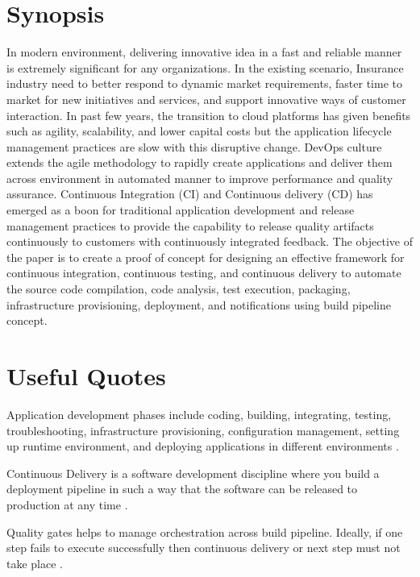 \section{Synopsis}
\label{s:Synopsis-5}
In modern environment, delivering innovative idea in a fast and reliable manner
is extremely significant for any organizations. In the existing scenario,
Insurance industry need to better respond to dynamic market requirements, faster
time to market for new initiatives and services, and support innovative ways of
customer interaction. In past few years, the transition to cloud platforms has
given benefits such as agility, scalability, and lower capital costs but the
application lifecycle management practices are slow with this disruptive change.
DevOps culture extends the agile methodology to rapidly create applications and
deliver them across environment in automated manner to improve performance and
quality assurance. Continuous Integration (CI) and Continuous delivery (CD) has
emerged as a boon for traditional application development and release management
practices to provide the capability to release quality artifacts continuously to
customers with continuously integrated feedback. The objective of the paper is
to create a proof of concept for designing an effective framework for continuous
integration, continuous testing, and continuous delivery to automate the source
code compilation, code analysis, test execution, packaging, infrastructure
provisioning, deployment, and notifications using build pipeline concept.

\section{Useful Quotes}
\label{s:Useful-Quotes-5}
Application development phases include coding, building, integrating, testing,
troubleshooting, infrastructure provisioning, configuration management, setting
up runtime environment, and deploying applications in different environments \citep{soniEndEndAutomation2015}.

Continuous Delivery is a software development discipline where you build a
deployment pipeline in such a way that the software can be released to
production at any time \citep{soniEndEndAutomation2015}.

Quality gates helps to manage orchestration across build pipeline. Ideally, if
one step fails to execute successfully then continuous delivery or next step
must not take place \citep{ soniEndEndAutomation2015}.


